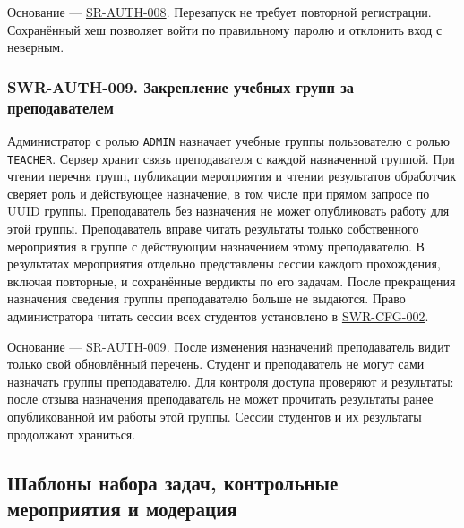\documentclass[12pt,a4paper]{article}
\begin{document}
Основание --- {\href{../04\_Системные\_требования/DOC-05\_Системные\_требования.pdf\#sr-auth-008}{SR-AUTH-008}}. Перезапуск не требует повторной регистрации. Сохранённый хеш позволяет войти по правильному паролю и отклонить вход с неверным.

\subsubsection{SWR-AUTH-009. Закрепление учебных групп за преподавателем}\label{swr-auth-009-ux437ux430ux43aux440ux435ux43fux43bux435ux43dux438ux435-ux443ux447ux435ux431ux43dux44bux445-ux433ux440ux443ux43fux43f-ux437ux430-ux43fux440ux435ux43fux43eux434ux430ux432ux430ux442ux435ux43bux435ux43c}

\hypertarget{swr-auth-009-закрепление-учебных-групп-за-преподавателем}{}

\hypertarget{swr-auth-009}{}

Администратор с ролью \texttt{ADMIN} назначает учебные группы пользователю с ролью \texttt{TEACHER}. Сервер хранит связь преподавателя с каждой назначенной группой. При чтении перечня групп, публикации мероприятия и чтении результатов обработчик сверяет роль и действующее назначение, в том числе при прямом запросе по UUID группы. Преподаватель без назначения не может опубликовать работу для этой группы. Преподаватель вправе читать результаты только собственного мероприятия в группе с действующим назначением этому преподавателю. В результатах мероприятия отдельно представлены сессии каждого прохождения, включая повторные, и сохранённые вердикты по его задачам. После прекращения назначения сведения группы преподавателю больше не выдаются. Право администратора читать сессии всех студентов установлено в {\hyperlink{swr-cfg-002}{SWR-CFG-002}}.

Основание --- {\href{../04\_Системные\_требования/DOC-05\_Системные\_требования.pdf\#sr-auth-009}{SR-AUTH-009}}. После изменения назначений преподаватель видит только свой обновлённый перечень. Студент и преподаватель не могут сами назначать группы преподавателю. Для контроля доступа проверяют и результаты: после отзыва назначения преподаватель не может прочитать результаты ранее опубликованной им работы этой группы. Сессии студентов и их результаты продолжают храниться.

\subsection{Шаблоны набора задач, контрольные мероприятия и модерация}\label{ux448ux430ux431ux43bux43eux43dux44b-ux43dux430ux431ux43eux440ux430-ux437ux430ux434ux430ux447-ux43aux43eux43dux442ux440ux43eux43bux44cux43dux44bux435-ux43cux435ux440ux43eux43fux440ux438ux44fux442ux438ux44f-ux438-ux43cux43eux434ux435ux440ux430ux446ux438ux44f}
\end{document}
